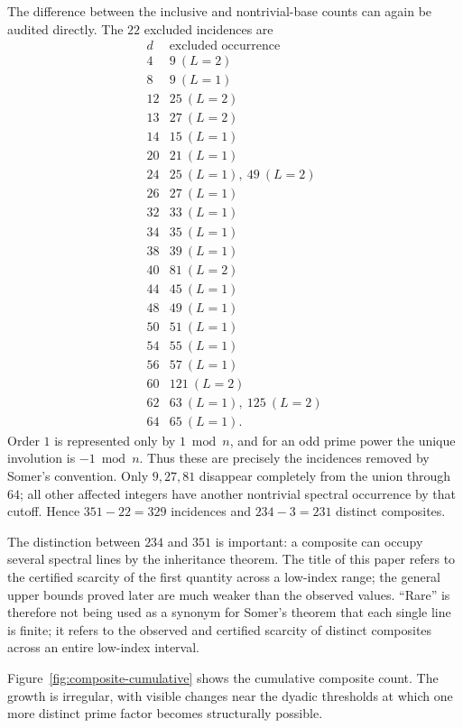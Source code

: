 \documentclass[11pt]{article}
\begin{document}
The difference between the inclusive and nontrivial-base counts can again be
audited directly.  The $22$ excluded incidences are
\[
\begin{array}{c|l}
d&\text{excluded occurrence}\\ \hline
4&9\ (L=2)\\
8&9\ (L=1)\\
12&25\ (L=2)\\
13&27\ (L=2)\\
14&15\ (L=1)\\
20&21\ (L=1)\\
24&25\ (L=1),\ 49\ (L=2)\\
26&27\ (L=1)\\
32&33\ (L=1)\\
34&35\ (L=1)\\
38&39\ (L=1)\\
40&81\ (L=2)\\
44&45\ (L=1)\\
48&49\ (L=1)\\
50&51\ (L=1)\\
54&55\ (L=1)\\
56&57\ (L=1)\\
60&121\ (L=2)\\
62&63\ (L=1),\ 125\ (L=2)\\
64&65\ (L=1).
\end{array}
\]
Order $1$ is represented only by $1\bmod n$, and for an odd prime power the
unique involution is $-1\bmod n$.  Thus these are precisely the incidences
removed by Somer's convention.  Only $9,27,81$ disappear completely from the
union through $64$; all other affected integers have another nontrivial
spectral occurrence by that cutoff.  Hence $351-22=329$ incidences and
$234-3=231$ distinct composites.

The distinction between $234$ and $351$ is important: a composite can occupy
several spectral lines by the inheritance theorem.  The title of this paper refers to the certified scarcity of the first quantity across a low-index range; the general upper bounds proved later are much weaker than the observed values.  ``Rare'' is therefore not being used as a
synonym for Somer's theorem that each single line is finite; it refers to the
observed and certified scarcity of distinct composites across an entire
low-index interval.

Figure~\ref{fig:composite-cumulative} shows the cumulative composite count.
The growth is irregular, with visible changes near the dyadic thresholds at
which one more distinct prime factor becomes structurally possible.
\end{document}
